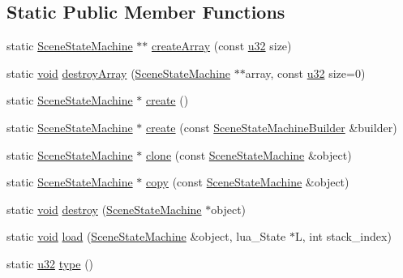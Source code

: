 \subsection*{Static Public Member Functions}
\begin{DoxyCompactItemize}
\item 
static \mbox{\hyperlink{classnjli_1_1_scene_state_machine}{Scene\+State\+Machine}} $\ast$$\ast$ \mbox{\hyperlink{classnjli_1_1_scene_state_machine_aa2304fea832ff06310a7812d347d5fa4}{create\+Array}} (const \mbox{\hyperlink{_util_8h_a10e94b422ef0c20dcdec20d31a1f5049}{u32}} size)
\item 
static \mbox{\hyperlink{_thread_8h_af1e856da2e658414cb2456cb6f7ebc66}{void}} \mbox{\hyperlink{classnjli_1_1_scene_state_machine_a9ce443b1a603e328c6e4b0e4d8579abd}{destroy\+Array}} (\mbox{\hyperlink{classnjli_1_1_scene_state_machine}{Scene\+State\+Machine}} $\ast$$\ast$array, const \mbox{\hyperlink{_util_8h_a10e94b422ef0c20dcdec20d31a1f5049}{u32}} size=0)
\item 
static \mbox{\hyperlink{classnjli_1_1_scene_state_machine}{Scene\+State\+Machine}} $\ast$ \mbox{\hyperlink{classnjli_1_1_scene_state_machine_aa6763773b5a04f92920c7965db0bd1b9}{create}} ()
\item 
static \mbox{\hyperlink{classnjli_1_1_scene_state_machine}{Scene\+State\+Machine}} $\ast$ \mbox{\hyperlink{classnjli_1_1_scene_state_machine_a70e5e383bfe8e85378b722a0ab5259fc}{create}} (const \mbox{\hyperlink{classnjli_1_1_scene_state_machine_builder}{Scene\+State\+Machine\+Builder}} \&builder)
\item 
static \mbox{\hyperlink{classnjli_1_1_scene_state_machine}{Scene\+State\+Machine}} $\ast$ \mbox{\hyperlink{classnjli_1_1_scene_state_machine_a431d92c00f51476ac4e3734ab4beb8f9}{clone}} (const \mbox{\hyperlink{classnjli_1_1_scene_state_machine}{Scene\+State\+Machine}} \&object)
\item 
static \mbox{\hyperlink{classnjli_1_1_scene_state_machine}{Scene\+State\+Machine}} $\ast$ \mbox{\hyperlink{classnjli_1_1_scene_state_machine_a123b3de15599ad532fd6e7ab3341bab0}{copy}} (const \mbox{\hyperlink{classnjli_1_1_scene_state_machine}{Scene\+State\+Machine}} \&object)
\item 
static \mbox{\hyperlink{_thread_8h_af1e856da2e658414cb2456cb6f7ebc66}{void}} \mbox{\hyperlink{classnjli_1_1_scene_state_machine_ac5cd66601629095b24f9b481670b6bfd}{destroy}} (\mbox{\hyperlink{classnjli_1_1_scene_state_machine}{Scene\+State\+Machine}} $\ast$object)
\item 
static \mbox{\hyperlink{_thread_8h_af1e856da2e658414cb2456cb6f7ebc66}{void}} \mbox{\hyperlink{classnjli_1_1_scene_state_machine_a8263efd65894599a95b65e45c2f161b5}{load}} (\mbox{\hyperlink{classnjli_1_1_scene_state_machine}{Scene\+State\+Machine}} \&object, lua\+\_\+\+State $\ast$L, int stack\+\_\+index)
\item 
static \mbox{\hyperlink{_util_8h_a10e94b422ef0c20dcdec20d31a1f5049}{u32}} \mbox{\hyperlink{classnjli_1_1_scene_state_machine_abca4021d6883832f287a1f259bb563a0}{type}} ()
\end{DoxyCompactItemize}
